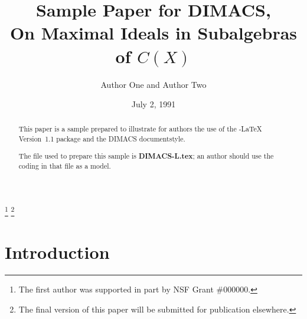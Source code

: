 %

\newtheorem{lemma}{Lemma}[section]
\newtheorem{theorem}{Theorem}[section]
\newtheorem{definition}{Definition}[section]

\theoremstyle{definition}
\newtheorem{example}{Example}[section]




\title[MAXIMAL IDEALS IN SUBALGEBRAS OF $C(X)$]{Sample Paper for DIMACS,\\
On Maximal Ideals in Subalgebras of $C(X)$}
\author[AUTHOR ONE AND AUTHOR TWO]{Author One and Author Two}
\address{Department of Mathematics, Northeastern University, Boston,
Massachusetts 02115} %
\address{Mathematical Research Section, School of Mathematical Sciences,
Australian National University, Canberra ACT 2601, Australia} %

\date{July 2, 1991}

\thanks{The first author was supported in part by NSF
Grant \#000000.}
\thanks{The final version of this paper will be submitted for
publication elsewhere.}

\maketitle

\begin{abstract}
This paper is a sample prepared to illustrate for authors
the use of the \AmS-\LaTeX{} Version~1.1 package and the DIMACS documentstyle.

The file used to prepare this sample is {\bf DIMACS-L.tex}; an author
should use the coding in that file as a model.
\end{abstract}

\section{Introduction}

